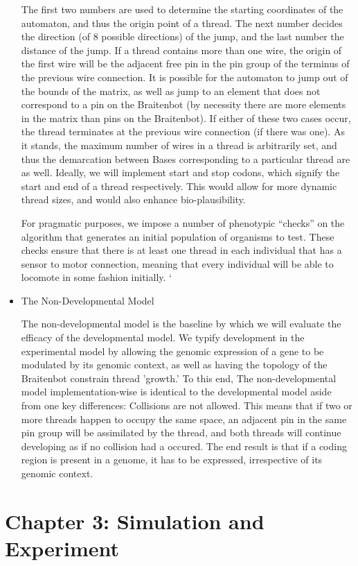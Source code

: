\documentclass[11pt]{article}
\begin{document}
\begin{itemize}
The first two numbers are used to determine the starting coordinates of the automaton, and thus the origin point of a thread. The next number decides the direction (of 8 possible directions) of the jump, and the last number the distance of the jump. If a thread contains more than one wire, the origin of the first wire will be the adjacent free pin in the pin group of the terminus of the previous wire connection. It is possible for the automaton to jump out of the bounds of the matrix, as well as jump to an element that does not correspond to a pin on the Braitenbot (by necessity there are more elements in the matrix than pins on the Braitenbot). If either of these two cases occur, the thread terminates at the previous wire connection (if there was one).  As it stands, the maximum number of wires in a thread is arbitrarily set, and thus the demarcation between Bases corresponding to a particular thread are as well. Ideally, we will implement start and stop codons, which signify the start and end of a thread respectively. This would allow for more dynamic thread sizes, and would also enhance bio-plausibility.

For pragmatic purposes, we impose a number of phenotypic “checks” on the algorithm that generates an initial population of organisms to test. These checks ensure that there is at least one thread in each individual that has a sensor to motor connection, meaning that every individual will be able to locomote in some fashion initially.
`
\item The Non-Developmental Model
\label{sec:orgheadline18}

The non-developmental model is the baseline by which we will evaluate the efficacy of the developmental model. We typify development in the experimental model by allowing the genomic expression of a gene to be modulated by its genomic context, as well as having the topology of the Braitenbot constrain thread 'growth.' To this end, The non-developmental model implementation-wise is identical to the developmental model aside from one key differences: Collisions are not allowed. This means that if two or more threads happen to occupy the same space, an adjacent pin in the same pin group will be assimilated by the thread, and both threads will continue developing as if no collision had a occured. The end result is that if a coding region is present in a genome, it has to be expressed, irrespective of its genomic context.
\end{itemize}

\section*{Chapter 3: Simulation and Experiment}
\label{sec:orgheadline38}
\end{document}
